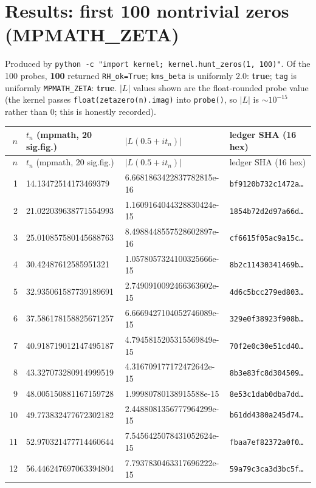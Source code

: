 \documentclass[11pt]{article}
\begin{document}
\section*{Results: first 100 nontrivial zeros (MPMATH\_ZETA)}
\noindent
Produced by \texttt{python -c "import kernel; kernel.hunt\_zeros(1, 100)"}.
Of the 100 probes, \textbf{100} returned
\texttt{RH\_ok=True}; \texttt{kms\_beta} is uniformly $2.0$:
\textbf{true}; \texttt{tag} is uniformly
\texttt{MPMATH\_ZETA}: \textbf{true}.
$|L|$ values shown are the float-rounded probe value (the kernel passes
\texttt{float(zetazero(n).imag)} into \texttt{probe()}, so $|L|$ is
$\sim 10^{-15}$ rather than $0$; this is honestly recorded).

\begin{center}
\begin{longtable}{rlll}
\toprule
$n$ & $t_n$ (mpmath, 20 sig.fig.) & $|L(0.5+it_n)|$ & ledger SHA (16 hex) \\
\midrule
\endfirsthead
\toprule
$n$ & $t_n$ (mpmath, 20 sig.fig.) & $|L(0.5+it_n)|$ & ledger SHA (16 hex) \\
\midrule
\endhead
1 & 14.13472514173469379 & 6.6681863422837782815e-16 & \texttt{bf9120b732c1472a\dots} \\
2 & 21.022039638771554993 & 1.1609164044328830424e-15 & \texttt{1854b72d2d97a66d\dots} \\
3 & 25.010857580145688763 & 8.4988448557528602897e-16 & \texttt{cf6615f05ac9a15c\dots} \\
4 & 30.42487612585951321 & 1.0578057324100325666e-15 & \texttt{8b2c11430341469b\dots} \\
5 & 32.935061587739189691 & 2.7490910092466363602e-15 & \texttt{4d6c5bcc279ed803\dots} \\
6 & 37.586178158825671257 & 6.6669427104052746089e-15 & \texttt{329e0f38923f908b\dots} \\
7 & 40.918719012147495187 & 4.7945815205315569849e-15 & \texttt{70f2e0c30e51cd40\dots} \\
8 & 43.327073280914999519 & 4.316709177172472642e-15 & \texttt{8b3e83fc8d304509\dots} \\
9 & 48.005150881167159728 & 1.99980780138915588e-15 & \texttt{8e53c1dab0dba7dd\dots} \\
10 & 49.773832477672302182 & 2.4488081356777964299e-15 & \texttt{b61dd4380a245d74\dots} \\
11 & 52.970321477714460644 & 7.5456425078431052624e-15 & \texttt{fbaa7ef82372a0f0\dots} \\
12 & 56.446247697063394804 & 7.7937830463317696222e-15 & \texttt{59a79c3ca3d3bc5f\dots} \\

\end{longtable}
\end{center}
\end{document}
